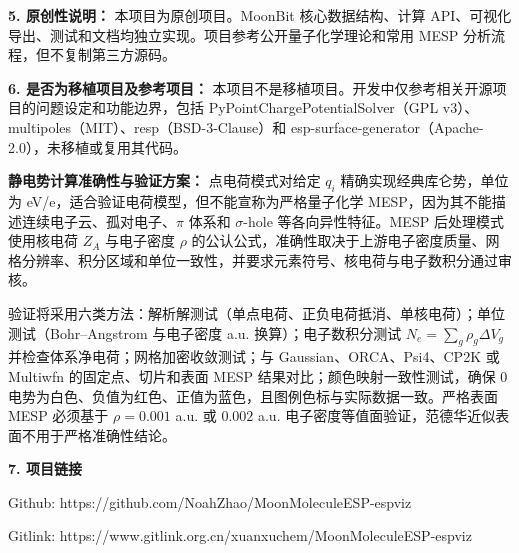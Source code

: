 \documentclass[10pt,a4paper]{ctexart}
\begin{document}
\textbf{5. 原创性说明：}
本项目为原创项目。MoonBit 核心数据结构、计算 API、可视化导出、测试和文档均独立实现。项目参考公开量子化学理论和常用 MESP 分析流程，但不复制第三方源码。

\textbf{6. 是否为移植项目及参考项目：}
本项目不是移植项目。开发中仅参考相关开源项目的问题设定和功能边界，包括 PyPointChargePotentialSolver（GPL v3）、multipoles（MIT）、resp（BSD-3-Clause）和 esp-surface-generator（Apache-2.0），未移植或复用其代码。

\textbf{静电势计算准确性与验证方案：}
点电荷模式对给定 $q_i$ 精确实现经典库仑势，单位为 eV/e，适合验证电荷模型，但不能宣称为严格量子化学 MESP，因为其不能描述连续电子云、孤对电子、$\pi$ 体系和 $\sigma$-hole 等各向异性特征。MESP 后处理模式使用核电荷 $Z_A$ 与电子密度 $\rho$ 的公认公式，准确性取决于上游电子密度质量、网格分辨率、积分区域和单位一致性，并要求元素符号、核电荷与电子数积分通过审核。

验证将采用六类方法：解析解测试（单点电荷、正负电荷抵消、单核电荷）；单位测试（Bohr--Angstrom 与电子密度 a.u. 换算）；电子数积分测试 $N_e=\sum_g\rho_g\Delta V_g$ 并检查体系净电荷；网格加密收敛测试；与 Gaussian、ORCA、Psi4、CP2K 或 Multiwfn 的固定点、切片和表面 MESP 结果对比；颜色映射一致性测试，确保 0 电势为白色、负值为红色、正值为蓝色，且图例色标与实际数据一致。严格表面 MESP 必须基于 $\rho=0.001$ a.u. 或 $0.002$ a.u. 电子密度等值面验证，范德华近似表面不用于严格准确性结论。

\textbf{7. 项目链接}

Github: https://github.com/NoahZhao/MoonMoleculeESP-espviz

Gitlink: https://www.gitlink.org.cn/xuanxuchem/MoonMoleculeESP-espviz
\end{document}
